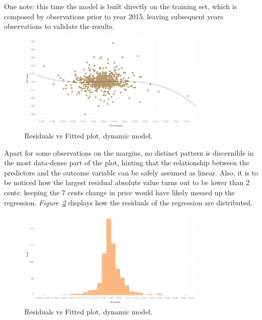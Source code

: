\documentclass[a4paper,12pt]{book}
\begin{document}
One note: this time the model is built directly on the training set, which is composed by observations prior to year 2015, leaving subsequent years observations to validate the results.

\begin{figure}[tb]
\begin{center}
\captionsetup{justification=centering}
\includegraphics[width=0.8\textwidth]{Images/dynres.png}
\caption{Residuals vs Fitted plot, dynamic model.}
\label{fig:dyn}
\end{center}
\end{figure}

Apart for some observations on the margins, no distinct pattern is discernible in the most data-dense part of the plot, hinting that the relationship between the predictors and the outcome variable can be safely assumed as linear. Also, it is to be noticed how the largest residual absolute value turns out to be lower than 2 cents: keeping the 7 cents change in price would have likely messed up the regression. \textit{Figure~\ref{fig:dyno}} displays how the residuals of the regression are distributed.

\begin{figure}[tb]
\begin{center}
\captionsetup{justification=centering}
\includegraphics[width=0.8\textwidth]{Images/disres.png}
\caption{Residuals vs Fitted plot, dynamic model.}
\label{fig:dyno}
\end{center}
\end{figure}
\end{document}
